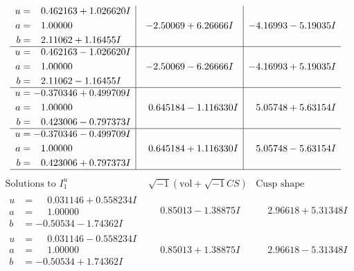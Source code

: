 \documentclass[1p]{elsarticle_modified}
\theoremstyle{definition}
\newcommand{\I}{\sqrt{-1}}
\begin{document}
$$\begin{array}{c|c|c}
\begin{aligned}
u &= \phantom{-}0.462163 + 1.026620 I \\
a &= \phantom{-}1.00000\phantom{ +0.000000I} \\
b &= \phantom{-}2.11062 + 1.16455 I\end{aligned}
 & -2.50069 + 6.26666 I & -4.16993 - 5.19035 I \\ \hline\begin{aligned}
u &= \phantom{-}0.462163 - 1.026620 I \\
a &= \phantom{-}1.00000\phantom{ +0.000000I} \\
b &= \phantom{-}2.11062 - 1.16455 I\end{aligned}
 & -2.50069 - 6.26666 I & -4.16993 + 5.19035 I \\ \hline\begin{aligned}
u &= -0.370346 + 0.499709 I \\
a &= \phantom{-}1.00000\phantom{ +0.000000I} \\
b &= \phantom{-}0.423006 - 0.797373 I\end{aligned}
 & \phantom{-}0.645184 - 1.116330 I & \phantom{-}5.05748 + 5.63154 I \\ \hline\begin{aligned}
u &= -0.370346 - 0.499709 I \\
a &= \phantom{-}1.00000\phantom{ +0.000000I} \\
b &= \phantom{-}0.423006 + 0.797373 I\end{aligned}
 & \phantom{-}0.645184 + 1.116330 I & \phantom{-}5.05748 - 5.63154 I\\
 \hline 
 \end{array}$$\newpage$$\begin{array}{c|c|c}  
\text{Solutions to }I^u_{1}& \I (\text{vol} + \sqrt{-1}CS) & \text{Cusp shape}\\
 \hline 
\begin{aligned}
u &= \phantom{-}0.031146 + 0.558234 I \\
a &= \phantom{-}1.00000\phantom{ +0.000000I} \\
b &= -0.50534 - 1.74362 I\end{aligned}
 & \phantom{-}0.85013 - 1.38875 I & \phantom{-}2.96618 + 5.31348 I \\ \hline\begin{aligned}
u &= \phantom{-}0.031146 - 0.558234 I \\
a &= \phantom{-}1.00000\phantom{ +0.000000I} \\
b &= -0.50534 + 1.74362 I\end{aligned}
 & \phantom{-}0.85013 + 1.38875 I & \phantom{-}2.96618 - 5.31348 I \\ \hline\begin{aligned}

\end{aligned}
\end{array}$$
\end{document}

